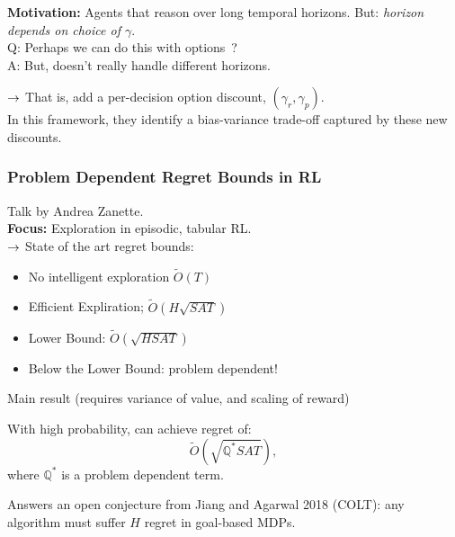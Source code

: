 {\bf Motivation:} Agents that reason over long temporal horizons. But: {\it horizon depends on choice of $\gamma$}. \\

Q: Perhaps we can do this with options~\cite{sutton1999between}? \\

A: But, doesn't really handle different horizons. \\


$\rightarrow$ That is, add a per-decision option discount, $(\gamma_r, \gamma_p)$. \\

In this framework, they identify a bias-variance trade-off captured by these new discounts. \\

\spacerule

\subsubsection{Problem Dependent Regret Bounds in RL}

Talk by Andrea Zanette. \\

{\bf Focus:} Exploration in episodic, tabular RL. \\

$\rightarrow$ State of the art regret bounds:
\begin{itemize}
    \item No intelligent exploration $\tilde{O}(T)$
    \item Efficient Expliration; $\tilde{O}(H\sqrt{SAT})$
    \item Lower Bound: $\tilde{O}(\sqrt{HSAT})$
    \item Below the Lower Bound: problem dependent!
\end{itemize}

Main result (requires variance of value, and scaling of reward)
\begin{theorem}
With high probability, can achieve regret of:
\[
\tilde{O}(\sqrt{\mathbb{Q}^*SAT}),
\]
where $\mathbb{Q}^*$ is a problem dependent term.
\end{theorem}

Answers an open conjecture from Jiang and Agarwal 2018 (COLT): any algorithm must suffer $H$ regret in goal-based MDPs. \\

